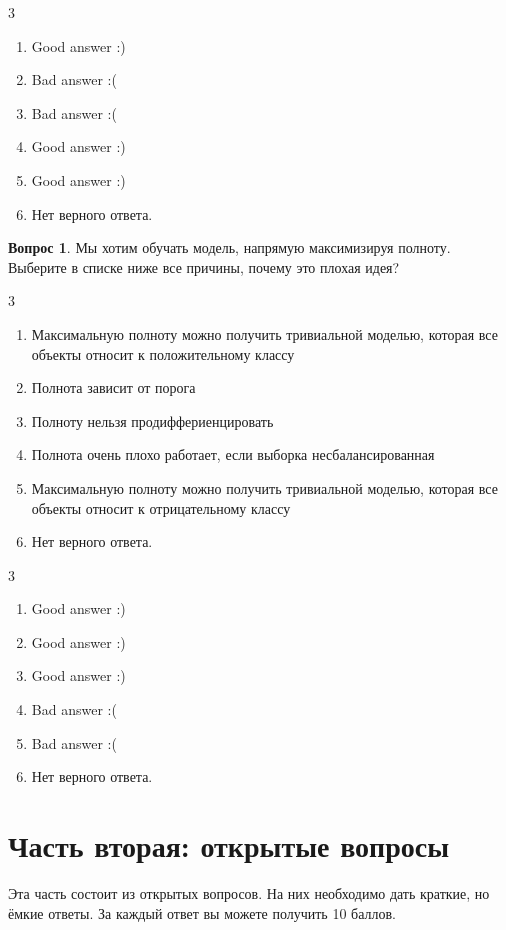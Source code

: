 \documentclass[12pt]{article}
\newenvironment{answerlist}[1][3]{
\begin{multicols}{#1}

\begin{enumerate}[label=\fbox{\emph{\Alph*}},ref=\emph{\alph*}]
}
{
\item Нет верного ответа.
\end{enumerate}
\end{multicols}
}
\theoremstyle{definition}
\newtheorem{question}{Вопрос}
\begin{document}
\begin{solution}
\begin{answerlist}
  \item Good answer :)
  \item Bad answer :(
  \item Bad answer :(
  \item Good answer :)
  \item Good answer :)
\end{answerlist}
\end{solution}




\begin{question}
Мы хотим обучать модель, напрямую максимизируя полноту. Выберите в списке ниже все причины, почему это плохая идея? 
\begin{answerlist}
   \item Максимальную полноту можно получить тривиальной моделью, которая все объекты относит к положительному классу
   \item Полнота зависит от порога
   \item Полноту нельзя продиффериенцировать 
   \item Полнота очень плохо работает, если выборка несбалансированная
   \item Максимальную полноту можно получить тривиальной моделью, которая все объекты относит к отрицательному классу
\end{answerlist}
\end{question}

\begin{solution}
\begin{answerlist}
  \item Good answer :)
  \item Good answer :)
  \item Good answer :)
  \item Bad answer :(
  \item Bad answer :(
\end{answerlist}
\end{solution}




\newpage 

 
\section*{Часть вторая: открытые вопросы}

Эта часть состоит из открытых вопросов. На них необходимо дать краткие, но ёмкие ответы. За каждый ответ вы можете получить 10 баллов.
\end{document}
